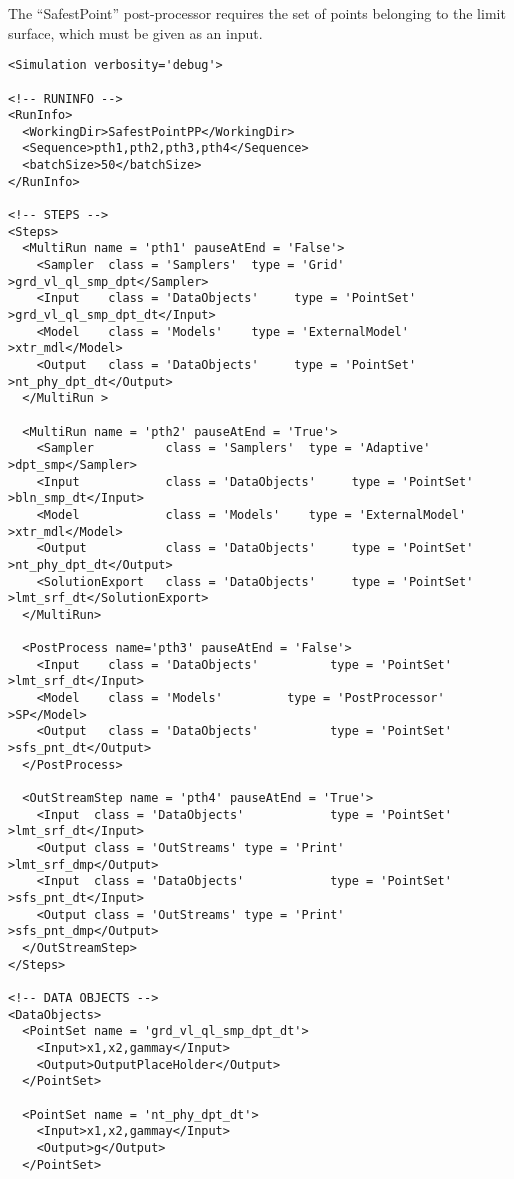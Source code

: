 The ``SafestPoint'' post-processor requires the set of points belonging to the
limit surface, which must be given as an input.

\begin{lstlisting}[style=XML,morekeywords={debug,re,seeding,class,subType,limit}]
<Simulation verbosity='debug'>

<!-- RUNINFO -->
<RunInfo>
  <WorkingDir>SafestPointPP</WorkingDir>
  <Sequence>pth1,pth2,pth3,pth4</Sequence>
  <batchSize>50</batchSize>
</RunInfo>

<!-- STEPS -->
<Steps>
  <MultiRun name = 'pth1' pauseAtEnd = 'False'>
    <Sampler  class = 'Samplers'  type = 'Grid'           >grd_vl_ql_smp_dpt</Sampler>
    <Input    class = 'DataObjects'     type = 'PointSet'   >grd_vl_ql_smp_dpt_dt</Input>
    <Model    class = 'Models'    type = 'ExternalModel'  >xtr_mdl</Model>
    <Output   class = 'DataObjects'     type = 'PointSet'   >nt_phy_dpt_dt</Output>
  </MultiRun >

  <MultiRun name = 'pth2' pauseAtEnd = 'True'>
    <Sampler          class = 'Samplers'  type = 'Adaptive'      >dpt_smp</Sampler>
    <Input            class = 'DataObjects'     type = 'PointSet'  >bln_smp_dt</Input>
    <Model            class = 'Models'    type = 'ExternalModel' >xtr_mdl</Model>
    <Output           class = 'DataObjects'     type = 'PointSet'  >nt_phy_dpt_dt</Output>
    <SolutionExport   class = 'DataObjects'     type = 'PointSet'  >lmt_srf_dt</SolutionExport>
  </MultiRun>

  <PostProcess name='pth3' pauseAtEnd = 'False'>
    <Input    class = 'DataObjects'          type = 'PointSet'       >lmt_srf_dt</Input>
    <Model    class = 'Models'         type = 'PostProcessor'  >SP</Model>
    <Output   class = 'DataObjects'          type = 'PointSet'     >sfs_pnt_dt</Output>
  </PostProcess>

  <OutStreamStep name = 'pth4' pauseAtEnd = 'True'>
  	<Input  class = 'DataObjects'            type = 'PointSet'  >lmt_srf_dt</Input>
  	<Output class = 'OutStreams' type = 'Print'         >lmt_srf_dmp</Output>
    <Input  class = 'DataObjects'            type = 'PointSet'  >sfs_pnt_dt</Input>
  	<Output class = 'OutStreams' type = 'Print'         >sfs_pnt_dmp</Output>
  </OutStreamStep>
</Steps>

<!-- DATA OBJECTS -->
<DataObjects>
  <PointSet name = 'grd_vl_ql_smp_dpt_dt'>
    <Input>x1,x2,gammay</Input>
    <Output>OutputPlaceHolder</Output>
  </PointSet>

  <PointSet name = 'nt_phy_dpt_dt'>
    <Input>x1,x2,gammay</Input>
    <Output>g</Output>
  </PointSet>


\end{lstlisting}
